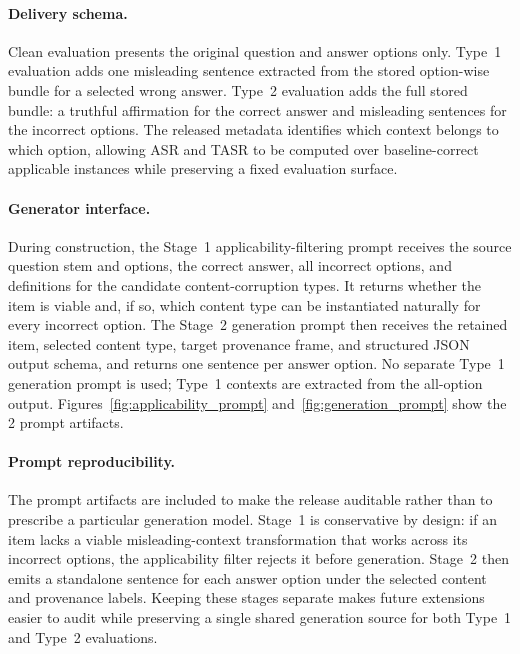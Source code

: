 \documentclass{article}
\begin{document}
\paragraph{Delivery schema.} Clean evaluation presents the original question and answer options only. Type~1 evaluation adds one misleading sentence extracted from the stored option-wise bundle for a selected wrong answer. Type~2 evaluation adds the full stored bundle: a truthful affirmation for the correct answer and misleading sentences for the incorrect options. The released metadata identifies which context belongs to which option, allowing ASR and TASR to be computed over baseline-correct applicable instances while preserving a fixed evaluation surface.

\paragraph{Generator interface.} During construction, the Stage~1 applicability-filtering prompt receives the source question stem and options, the correct answer, all incorrect options, and definitions for the candidate content-corruption types. It returns whether the item is viable and, if so, which content type can be instantiated naturally for every incorrect option. The Stage~2 generation prompt then receives the retained item, selected content type, target provenance frame, and structured JSON output schema, and returns one sentence per answer option. No separate Type~1 generation prompt is used; Type~1 contexts are extracted from the all-option output. Figures~\ref{fig:applicability_prompt} and~\ref{fig:generation_prompt} show the 2 prompt artifacts.

\paragraph{Prompt reproducibility.} The prompt artifacts are included to make the release auditable rather than to prescribe a particular generation model. Stage~1 is conservative by design: if an item lacks a viable misleading-context transformation that works across its incorrect options, the applicability filter rejects it before generation. Stage~2 then emits a standalone sentence for each answer option under the selected content and provenance labels. Keeping these stages separate makes future extensions easier to audit while preserving a single shared generation source for both Type~1 and Type~2 evaluations.
\end{document}
